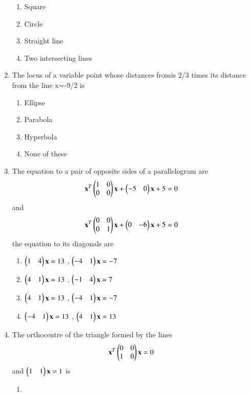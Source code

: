 \begin{enumerate}
    \begin{enumerate}
     \item  Square
     \item  Circle
     \item  Straight line
     \item  Two intersecting lines
     \end{enumerate}
    \item The locus of a variable point whose distances fromis 2/3 times its distance from the line x=-9/2 is
    \begin{enumerate}
     \item  Ellipse
     \item  Parabola
     \item  Hyperbola
     \item  None of these
    \end{enumerate}
    \item The equation to a pair of opposite sides of a parallelogram are  \begin{align} 
    \mathbf{x}^T\begin{pmatrix}1 & 0 \\ 0 & 0\end{pmatrix}\mathbf{x} + \begin{pmatrix}-5 & 0\end{pmatrix}\mathbf{x} + 5 &= 0\end{align} and \begin{align} 
    \mathbf{x}^T\begin{pmatrix}0 & 0 \\ 0 & 1\end{pmatrix}\mathbf{x} + \begin{pmatrix}0 & -6\end{pmatrix}\mathbf{x} + 5 &= 0\end{align}  the equation to its diagonals are
    \begin{enumerate}
     \item  $\begin{pmatrix}1 & 4\end{pmatrix} \mathbf x =13$ , $\begin{pmatrix}-4 & 1\end{pmatrix} \mathbf x= -7$
     \item   $\begin{pmatrix}4 & 1\end{pmatrix} \mathbf x =13$ , $\begin{pmatrix}-1 & 4\end{pmatrix} \mathbf x= 7$
     \item   $\begin{pmatrix}4 & 1\end{pmatrix} \mathbf x =13$ , $\begin{pmatrix}-4 & 1\end{pmatrix} \mathbf x= -7$
     \item   $\begin{pmatrix}-4 & 1\end{pmatrix} \mathbf x =13$ , $\begin{pmatrix}4 & 1\end{pmatrix} \mathbf x= 13$
     \end{enumerate}
    \item The orthocentre of the triangle formed by the lines \begin{align}
    \mathbf {x}^T\begin{pmatrix}0 & 0 \\ 1 & 0\end{pmatrix} \mathbf{x} &=0
    \end{align} and $\begin{pmatrix}1 & 1\end{pmatrix} \mathbf x =1$ is 
    \begin{enumerate}
     \item {}

\end{enumerate}
\end{enumerate}
